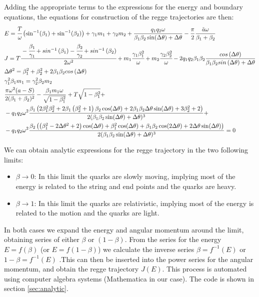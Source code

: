 \documentclass[11pt,a4paper]{article}
\begin{document}
Adding the appropriate terms to the expressions for the energy and boundary equations, the equations for construction of the regge trajectories are then:
\begin{subequations}
\label{eq:regge}
\begin{align}
&E=\cfrac{T}{\omega}\left(\sin^{-1}(\beta_{1})+\sin^{-1}(\beta_{2})\right)+\gamma_{1}m_{1}+\gamma_{2}m_{2}+\frac{q_{1}q_{2}\omega}{\beta_{1}\beta_{2}\sin(\Delta\theta)+\Delta\theta}-\frac{\pi}{2}\frac{\tilde{a}\omega}{\beta_{1}+\beta_{2}}\\
&J=T\cfrac{-\cfrac{\beta_{1}}{\gamma_{1}}+sin^{-1}\left(\beta_{1}\right)-\cfrac{\beta_{2}}{\gamma_{2}}+sin^{-1}\left(\beta_{2}\right)}{2\omega^{2}}+m_{1}\cfrac{\gamma_{1}\beta_{1}^{2}}{\omega}+m_{2}\cfrac{\gamma_{2}\beta_{2}^{2}}{\omega}-2q_{1}q_{2}\beta_{1}\beta_{2}\frac{cos\left(\Delta\theta\right)}{\beta_{1}\beta_{2}sin\left(\Delta\theta\right)+\Delta\theta}\\
&\Delta\theta^{2}=\beta_{1}^{2}+\beta_{2}^{2}+2\beta_{1}\beta_{2}cos\left(\Delta\theta\right)\\
&\gamma_{1}^{2}\beta_{1}m_{1}=\gamma_{2}^{2}\beta_{2}m_{2}\\
&\frac{\pi  \omega ^2 (a-S)}{2 (\beta_1+\beta_2)^2}-\frac{\beta_1 m_1 \omega }{\sqrt{1-\beta_1^2}}+T\sqrt{1-\beta_1^2}+\\
&-q_1 q_2 \omega ^2 \frac{\beta_1 \left(2 \beta_1^2 \beta_2^2+2 \beta_1 \left(\beta_2^2+1\right) \beta_2 \cos (\Delta \theta )+2 \beta_1 \beta_2 \Delta \theta  \sin (\Delta \theta )+3 \beta_2^2+2\right)}{2 (\beta_1 \beta_2 \sin (\Delta \theta )+\Delta \theta )^3}+\notag\\
&-q_1 q_2 \omega ^2\frac{\beta_2 \left(\left(\beta_1^2-2 \Delta \theta ^2+2\right) \cos (\Delta \theta )+\beta_1^2 \cos (\Delta \theta )+\beta_1 \beta_2 \cos (2 \Delta \theta )+2 \Delta \theta  \sin (\Delta \theta )\right)}{2 (\beta_1 \beta_2 \sin (\Delta \theta )+\Delta \theta )^3}=0\notag
\end{align}
\end{subequations}

We can obtain analytic expressions for the regge trajectory in the two following limits:
\begin{itemize}
\item $\beta\rightarrow0$: In this limit the quarks are slowly moving, implying most of the energy is related to the string and end points and the quarks are heavy.
\item $\beta\rightarrow1$: In this limit the quarks are relativistic, implying most of the energy is related to the motion and the quarks are light.

\end{itemize}
In both cases we expand the energy and angular momentum around the limit, obtaining series of either $\beta$ or $\left(1-\beta\right)$. From the series for the energy $E=f\left(\beta\right)$ (or $E=f\left(1-\beta\right)$) we calculate the inverse series $\beta=f^{-1}\left(E\right)$ or $1-\beta=f^{-1}\left(E\right)$ .This can then be inserted into the power series for the angular momentum, and obtain the regge trajectory $J\left(E\right)$. This process is automated using computer algebra systems (Mathematica in our case). The code is shown in section \ref{sec:analytic}.
\end{document}
